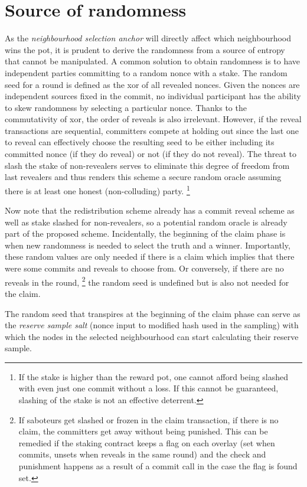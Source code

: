 
\section{Source of randomness}\label{sec:randomness}

As the \emph{neighbourhood selection anchor} will directly affect which neighbourhood wins the pot, it is prudent to derive the randomness from a source of entropy that cannot be manipulated. A common solution to obtain randomness is to have independent parties committing to a random nonce with a stake. The random seed for a round is defined as the xor of all revealed nonces. Given the nonces are independent sources fixed in the commit, no individual participant has the ability to skew randomness by selecting a particular nonce. Thanks to the commutativity of xor, the order of reveals is also irrelevant. However, if the reveal transactions are sequential, committers compete at holding out since the last one to reveal can effectively choose the resulting seed to be either including its committed nonce (if they do reveal) or not (if they do not reveal). The threat to slash the stake of non-revealers serves to eliminate this degree of freedom from last revealers and thus renders this scheme a secure random oracle assuming there is at least one honest (non-colluding) party.%
%
\footnote{If the stake is higher than the reward pot, one cannot  afford being slashed with even just one commit without a loss. If this cannot be guaranteed, slashing of the stake is not an effective deterrent.}

Now note that the redistribution scheme already has a commit reveal scheme as well as stake slashed for non-revealers, so a potential random oracle is already part of the proposed scheme. Incidentally, the beginning of the claim phase is when new randomness is needed to select the truth and a winner. Importantly, these random values are only needed if there is a claim which implies that there were some commits and reveals to choose from. Or conversely, if there are no reveals in the round,%
%
\footnote{If saboteurs get slashed or frozen in the claim transaction, if there is no claim, the committers get away without being punished. This can be remedied if the staking contract keeps a flag on each overlay (set when commits, unsets when reveals in the same round) and the check and punishment happens as a result of a commit call in the case the flag is found set.}
%
the random seed is undefined but is also not needed for the claim.

The random seed that transpires at the beginning of the claim phase can serve as the \emph{reserve sample salt} (nonce input to modified hash used in the sampling) with which the nodes in the selected neighbourhood can start calculating their reserve sample. 

